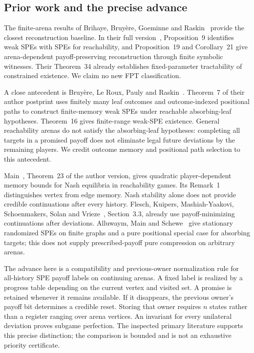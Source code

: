 \documentclass[acmlarge,11pt,screen,nonacm,natbib=false]{acmart}
\theoremstyle{remark}
\begin{document}
\subsection{Prior work and the precise advance}

The finite-arena results of Brihaye, Bruy\`ere, Goeminne and
Raskin~\cite{BBGR18,BBGR21} provide the closest reconstruction baseline.
In their full version~\cite{BBGR18}, Proposition~9 identifies weak
SPEs with SPEs for reachability, and Proposition~19 and Corollary~21 give
arena-dependent payoff-preserving reconstruction through finite symbolic
witnesses. Their Theorem~34 already establishes fixed-parameter tractability
of constrained existence. We claim no new FPT classification.

A close antecedent is Bruy\`ere, Le Roux, Pauly and
Raskin~\cite{BLPR21}. Theorem~7 of their author postprint uses finitely many
leaf outcomes and outcome-indexed positional paths to construct finite-memory
weak SPEs under reachable absorbing-leaf hypotheses. Theorem~16 gives
finite-range weak-SPE existence. General reachability arenas do not satisfy
the absorbing-leaf hypotheses: completing all targets in a promised payoff
does not eliminate legal future deviations by the remaining players.
We credit outcome memory and positional path selection to this antecedent.

Main~\cite{Main26}, Theorem~23 of the author version, gives quadratic
player-dependent memory bounds for Nash equilibria in reachability games.
Its Remark~1 distinguishes vertex from edge memory. Nash stability alone
does not provide credible continuations after every history. Flesch,
Kuipers, Mashiah-Yaakovi, Schoenmakers, Solan and Vrieze~\cite{FKMSSV10},
Section~3.3, already use payoff-minimizing continuations after deviations.
Alluwaym, Main and Schewe~\cite{AMS26} give stationary randomized SPEs on
finite graphs and a pure positional special case for absorbing targets;
this does not supply prescribed-payoff pure compression on arbitrary arenas.

The advance here is a compatibility and previous-owner normalization rule
for all-history SPE payoff labels on continuing arenas. A fixed label is
realized by a progress table depending on the current vertex and visited
set. A promise is retained whenever it remains available. If it disappears,
the previous owner's payoff bit determines a credible reset. Storing that
owner requires $n$ states rather than a register ranging over arena vertices.
An invariant for every unilateral deviation proves subgame perfection.
The inspected primary literature supports this precise distinction;
the comparison is bounded and is not an exhaustive priority certificate.
\end{document}
